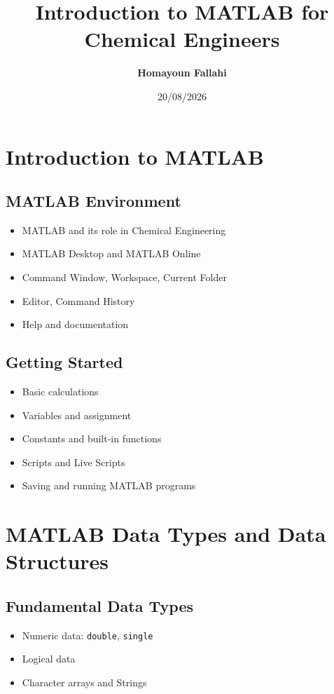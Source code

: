 \documentclass[11pt, a4paper]{article}
\title{{\Large Introduction to MATLAB for Chemical Engineers}}
\author{\textbf{Homayoun Fallahi}}
\date{20/08/2026}
\begin{document}
\section{Introduction to MATLAB}

\subsection{MATLAB Environment}
\begin{itemize}
  \item MATLAB and its role in Chemical Engineering
  \item MATLAB Desktop and MATLAB Online
  \item Command Window, Workspace, Current Folder
  \item Editor, Command History
  \item Help and documentation
\end{itemize}

\subsection{Getting Started}
\begin{itemize}
  \item Basic calculations
  \item Variables and assignment
  \item Constants and built-in functions
  \item Scripts and Live Scripts
  \item Saving and running MATLAB programs
\end{itemize}

\section{MATLAB Data Types and Data Structures}

\subsection{Fundamental Data Types}
\begin{itemize}
  \item Numeric data: \texttt{double}, \texttt{single}
  \item Logical data
  \item Character arrays and Strings
\end{itemize}
\end{document}
